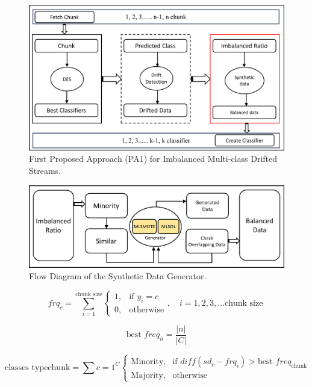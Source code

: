 \begin{figure}[!ht]
	\centering
	\includegraphics[width=1\linewidth]{4_Imbalanced/figures/approach_step_1.png}
	\caption{First Proposed Approach (PA1) for Imbalanced Multi-class Drifted Streams.}
	\label{fig:4_first_proposal_step_1}
\end{figure}
\begin{figure}[!ht]
	\centering
	\includegraphics[width=1\linewidth]{4_Imbalanced/figures/approach_step_2.png}
	\caption{Flow Diagram of the Synthetic Data Generator.}
	\label{fig:4_first_proposal_step_2}
\end{figure}

\begin{equation}
	\label{eq:4_first_proposal_1}
    frq_{c} = \sum_{i=1}^{\text{chunk size}} \begin{cases} 
    1, & \text{if } y_i = c \\
    0, & \text{otherwise}
    \end{cases}, \quad i = 1, 2, 3, \dots \text{chunk size}\;
\end{equation}

\begin{equation}
	\label{eq:4_first_proposal_2}
    \text{best } freq_{n} = \frac{|n|}{|C|}
\end{equation}

\begin{equation}
	\label{eq:4_first_proposal_3}
    \text{classes type}{\text{chunk}} = \sum{c=1}^{C} \begin{cases} 
    \text{Minority,} & \text{if } diff(sd_c - frq_i) > \text{best } freq_{\text{chunk}} \\
    \text{Majority,} & \text{otherwise}
    \end{cases}
\end{equation}


